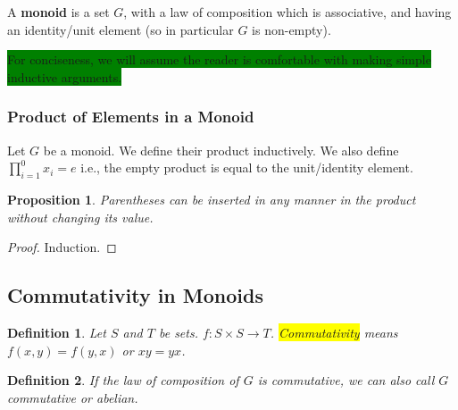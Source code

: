 \documentclass[12pt]{article}
\newcommand{\mybox}[2][black]{\colorbox{#1}{#2}}
\newtheorem{definition}{Definition}
\newtheorem{proposition}{Proposition}
\begin{document}
A \textbf{monoid} is a set $G$, with a law of composition which is associative, and having an identity/unit element (so in particular $G$ is non-empty).

\mybox[green]{For conciseness, we will assume the reader is comfortable with making simple inductive arguments.}

\subsubsection{Product of Elements in a Monoid}
Let $G$ be a monoid. We define their product inductively. We also define $\prod_{i=1}^{0} x_{i} = e$ i.e., the empty product is equal to the unit/identity element.

\begin{proposition}
Parentheses can be inserted in any manner in the product without changing its value. 
\end{proposition}

\begin{proof}
Induction.
\end{proof}



\subsection{Commutativity in Monoids}
\begin{definition}
Let $S$ and $T$ be sets. $f: S \times S \rightarrow T$. \mybox[yellow]{Commutativity} means $f(x,y) = f(y,x)$ or $xy = yx$.
\end{definition}

\begin{definition}
If the law of composition of $G$ is commutative, we can also call $G$ commutative or abelian.
\end{definition}
\end{document}
